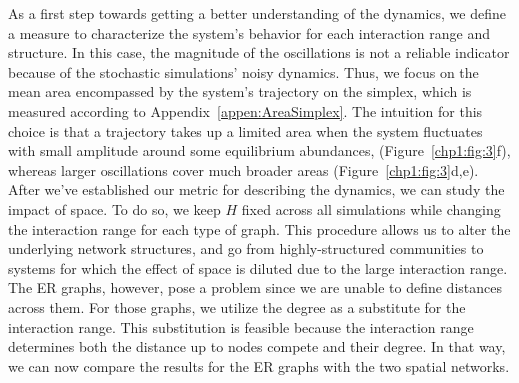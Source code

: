 As a first step towards getting a better understanding of the dynamics, we define a measure to characterize the system's behavior for each interaction range and structure. In this case, the magnitude of the oscillations is not a reliable indicator because of the stochastic simulations' noisy dynamics. Thus, we focus on the mean area encompassed by the system's trajectory on the simplex, which is measured according to Appendix~\ref{appen:AreaSimplex}. The intuition for this choice is that a trajectory takes up a limited area when the system fluctuates with small amplitude around some equilibrium abundances,  (Figure~\ref{chp1:fig:3}f), whereas larger oscillations cover much broader areas (Figure~\ref{chp1:fig:3}d,e).  \\

After we've established our metric for describing the dynamics, we can study the impact of space. To do so, we keep $H$ fixed across all simulations while changing the interaction range for each type of graph. This procedure allows us to alter the underlying network structures, and go from highly-structured communities to systems for which the effect of space is diluted due to the large interaction range. The ER graphs, however, pose a problem since we are unable to define distances across them. For those graphs, we utilize the degree as a substitute for the interaction range. This substitution is feasible because the interaction range determines both the distance up to nodes compete and their degree. In that way, we can now compare the results for the ER graphs with the two spatial networks.  \\


